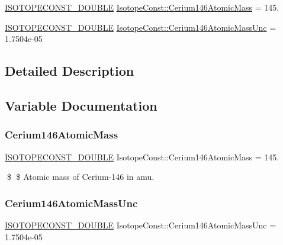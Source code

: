 \begin{DoxyCompactItemize}
\item 
\mbox{\hyperlink{group___isotope_const-_macros_ga8f45a7272ce02c0b4c65c44636ed719a}{I\+S\+O\+T\+O\+P\+E\+C\+O\+N\+S\+T\+\_\+\+D\+O\+U\+B\+LE}} \mbox{\hyperlink{group___isotope_const-_cerium-_ce146_gad52864b9d92d2cf181d37abcd5c987b6}{Isotope\+Const\+::\+Cerium146\+Atomic\+Mass}} = 145.
\item 
\mbox{\hyperlink{group___isotope_const-_macros_ga8f45a7272ce02c0b4c65c44636ed719a}{I\+S\+O\+T\+O\+P\+E\+C\+O\+N\+S\+T\+\_\+\+D\+O\+U\+B\+LE}} \mbox{\hyperlink{group___isotope_const-_cerium-_ce146_gaaee4887c1c39cd6f9818e282072d513b}{Isotope\+Const\+::\+Cerium146\+Atomic\+Mass\+Unc}} = 1.\+7504e-\/05
\end{DoxyCompactItemize}


\subsection{Detailed Description}


\subsection{Variable Documentation}
\mbox{\label{group___isotope_const-_cerium-_ce146_gad52864b9d92d2cf181d37abcd5c987b6}} 
\subsubsection{\texorpdfstring{Cerium146\+Atomic\+Mass}{Cerium146AtomicMass}}
{\footnotesize\ttfamily \mbox{\hyperlink{group___isotope_const-_macros_ga8f45a7272ce02c0b4c65c44636ed719a}{I\+S\+O\+T\+O\+P\+E\+C\+O\+N\+S\+T\+\_\+\+D\+O\+U\+B\+LE}} Isotope\+Const\+::\+Cerium146\+Atomic\+Mass = 145.}

\$ \$ Atomic mass of Cerium-\/146 in amu. \mbox{\label{group___isotope_const-_cerium-_ce146_gaaee4887c1c39cd6f9818e282072d513b}} 
\subsubsection{\texorpdfstring{Cerium146\+Atomic\+Mass\+Unc}{Cerium146AtomicMassUnc}}
{\footnotesize\ttfamily \mbox{\hyperlink{group___isotope_const-_macros_ga8f45a7272ce02c0b4c65c44636ed719a}{I\+S\+O\+T\+O\+P\+E\+C\+O\+N\+S\+T\+\_\+\+D\+O\+U\+B\+LE}} Isotope\+Const\+::\+Cerium146\+Atomic\+Mass\+Unc = 1.\+7504e-\/05}

